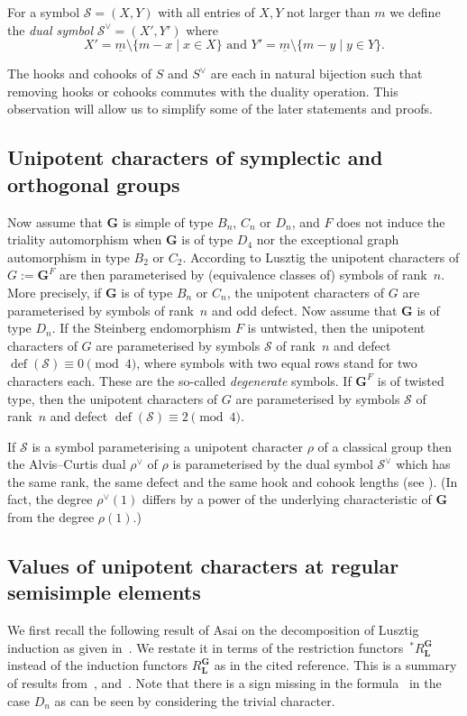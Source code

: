 \documentclass{ert-l}
\newcommand{\bG}{{\mathbf{G}}}
\newcommand{\bL}{{\mathbf{L}}}
\newcommand{\cS}{{\mathcal{S}}}
\newcommand{\df}{{\operatorname{def}}}
\newcommand\RLG{{R_\bL^\bG}}
\newcommand\sRLG{{\,{}^*R_\bL^\bG}}
\newcommand{\ul}[1]{\underline{#1}}
\theoremstyle{definition}
\theoremstyle{remark}
\begin{document}
For a symbol $\cS=(X,Y)$ with all entries of $X,Y$ not larger than $m$ we
define the \emph{dual symbol} $\cS^\vee=(X',Y')$ where
$$X'= \ul{m} \setminus \{m-x\mid x\in X\}\mbox{ and }
  Y'= \ul{m} \setminus \{m-y\mid y\in Y\}.$$

The hooks and cohooks of $S$ and $S^\vee$ are each in natural bijection such
that removing hooks or cohooks commutes with the duality operation.
This observation will allow us to simplify some of the later statements and
proofs.

\subsection{Unipotent characters of symplectic and orthogonal groups}   \label{subsec:uniBCD}
Now assume that $\bG$ is simple of type $B_n$, $C_n$ or $D_n$, and $F$ does
not induce the triality automorphism when $\bG$ is of type $D_4$ nor the
exceptional graph automorphism in type $B_2$ or $C_2$. According to Lusztig
\cite{Lu84} the unipotent characters of $G:=\bG^F$ are then parameterised by
(equivalence classes of) symbols of rank~$n$. More precisely, if $\bG$ is of
type $B_n$ or $C_n$, the unipotent characters of $G$ are parameterised by
symbols of rank~$n$ and odd defect. Now assume that $\bG$ is of type $D_n$.
If the Steinberg endomorphism $F$ is untwisted, then the unipotent characters
of $G$ are parameterised by symbols $\cS$ of rank~$n$ and defect
$\df(\cS)\equiv0\pmod4$, where symbols with two equal rows stand for two
characters each. These are the so-called \emph{degenerate} symbols. If $\bG^F$
is of twisted type, then the unipotent characters of $G$ are parameterised
by symbols $\cS$ of rank~$n$ and defect $\df(\cS)\equiv2\pmod4$.

If $\cS$ is a symbol parameterising a unipotent character $\rho$ of a classical
group then the Alvis--Curtis dual $\rho^\vee$ of $\rho$ is parameterised by the
dual symbol $\cS^\vee$ which has the same rank, the same defect and the same
hook and cohook lengths (see \cite[4.5.5, 4.6.8]{Lu84}).
(In fact, the degree $\rho^\vee(1)$ differs by a power of the underlying
characteristic of $\bG$ from the degree $\rho(1)$.)

\subsection{Values of unipotent characters at regular semisimple
elements}\label{subsec:MN}
We first recall the following result of Asai on the decomposition of Lusztig
induction as given in~\cite[(3.1), (3.2)]{FS86}. We restate it in terms of the
restriction functors $\sRLG$ instead of the induction functors $\RLG$ as
in the cited reference. This is a summary of results from~\cite[2.8]{As1},
\cite[1.5]{As2} and~\cite[2.2.3]{As3}. Note that there is a sign missing
in the formula~\cite[(3.2)]{FS86} in the case $D_n$ as can be seen by
considering the trivial character.
\end{document}
